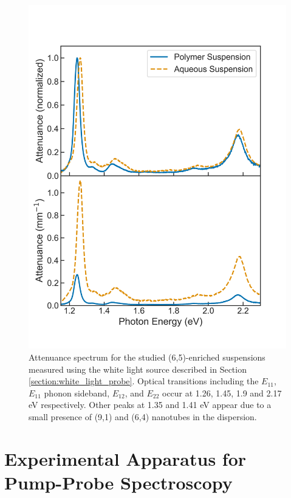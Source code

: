 \begin{figure}[H]
	\centering
	\includegraphics[scale=0.7]{images/chapter_methods/abs_comparison}
	\caption{ Attenuance spectrum for the studied (6,5)-enriched suspensions measured using the white light source described in Section \ref{section:white_light_probe}. Optical transitions including the $E_{11}$, $E_{11} $ phonon sideband, $E_{12}$, and $E_{22}$ occur at 1.26, 1.45, 1.9 and 2.17 eV respectively. Other peaks at 1.35 and 1.41 eV appear due to a small presence of (9,1) and (6,4) nanotubes in the dispersion.}
	\label{fig:sample_absorbance}
\end{figure}



\section{Experimental Apparatus for Pump-Probe Spectroscopy}
\label{sec:experimental_proced}

